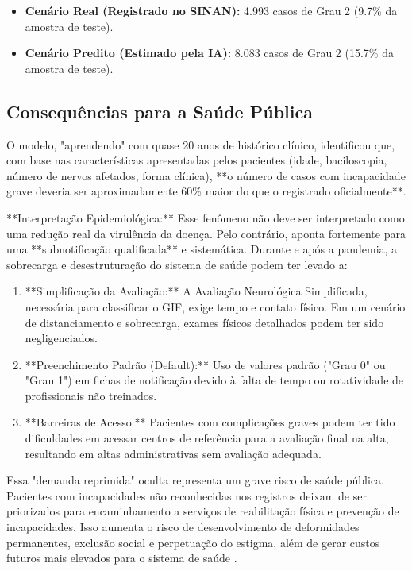 \documentclass[12pt, a4paper]{report}
\begin{document}
\begin{itemize}
    \item \textbf{Cenário Real (Registrado no SINAN):} 4.993 casos de Grau 2 (9.7\% da amostra de teste).
    \item \textbf{Cenário Predito (Estimado pela IA):} 8.083 casos de Grau 2 (15.7\% da amostra de teste).
\end{itemize}

\subsection{Consequências para a Saúde Pública}
O modelo, "aprendendo" com quase 20 anos de histórico clínico, identificou que, com base nas características apresentadas pelos pacientes (idade, baciloscopia, número de nervos afetados, forma clínica), **o número de casos com incapacidade grave deveria ser aproximadamente 60\% maior do que o registrado oficialmente**.

**Interpretação Epidemiológica:** Esse fenômeno não deve ser interpretado como uma redução real da virulência da doença. Pelo contrário, aponta fortemente para uma **subnotificação qualificada** e sistemática. Durante e após a pandemia, a sobrecarga e desestruturação do sistema de saúde podem ter levado a:
\begin{enumerate}
    \item **Simplificação da Avaliação:** A Avaliação Neurológica Simplificada, necessária para classificar o GIF, exige tempo e contato físico. Em um cenário de distanciamento e sobrecarga, exames físicos detalhados podem ter sido negligenciados.
    \item **Preenchimento Padrão (Default):** Uso de valores padrão ("Grau 0" ou "Grau 1") em fichas de notificação devido à falta de tempo ou rotatividade de profissionais não treinados.
    \item **Barreiras de Acesso:** Pacientes com complicações graves podem ter tido dificuldades em acessar centros de referência para a avaliação final na alta, resultando em altas administrativas sem avaliação adequada.
\end{enumerate}

Essa "demanda reprimida" oculta representa um grave risco de saúde pública. Pacientes com incapacidades não reconhecidas nos registros deixam de ser priorizados para encaminhamento a serviços de reabilitação física e prevenção de incapacidades. Isso aumenta o risco de desenvolvimento de deformidades permanentes, exclusão social e perpetuação do estigma, além de gerar custos futuros mais elevados para o sistema de saúde \citep{oliveira2024mobilidade}.
\end{document}
